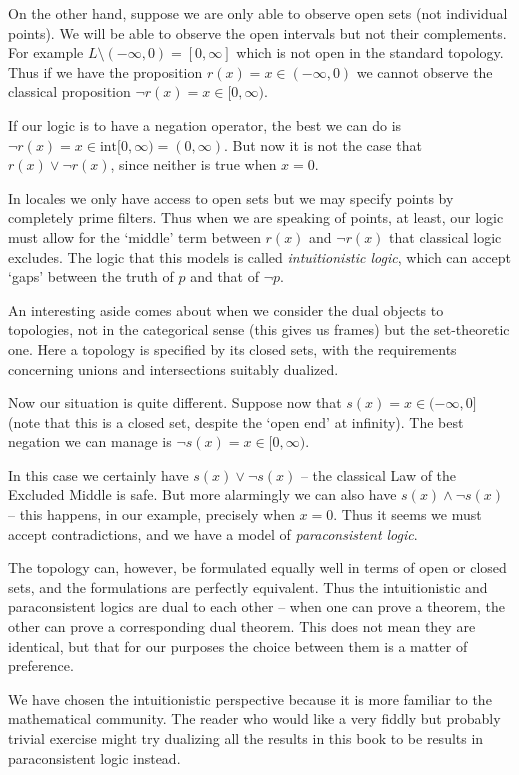 \documentclass[oneside,english]{amsbook}
\numberwithin{section}{chapter}
\theoremstyle{plain}
\theoremstyle{definition}
\begin{document}
On the other hand, suppose we are only able to observe open sets (not individual points). We will be able to observe the open intervals but not their complements. For example $L\setminus(-\infty, 0) = [0, \infty]$ which is not open in the standard topology. Thus if we have the proposition $r(x) = x\in (-\infty, 0)$ we cannot observe the classical proposition $\lnot r(x) = x\in [0, \infty)$. 

If our logic is to have a negation operator, the best we can do is $\lnot r(x) = x\in \text{int}[0, \infty) = (0, \infty)$. But now it is not the case that $r(x)\lor\lnot r(x)$, since neither is true when $x = 0$.

In locales we only have access to open sets but we may specify points by completely prime filters. Thus when we are speaking of points, at least, our logic must allow for the `middle' term between $r(x)$ and $\lnot r(x)$ that classical logic excludes. The logic that this models is called \emph{intuitionistic logic}, which can accept `gaps' between the truth of $p$ and that of $\lnot p$. 

An interesting aside comes about when we consider the dual objects to topologies, not in the categorical sense (this gives us frames) but the set-theoretic one. Here a topology is specified by its closed sets, with the requirements concerning unions and intersections suitably dualized.

Now our situation is quite different. Suppose now that $s(x) = x\in (-\infty, 0]$ (note that this is a closed set, despite the `open end' at infinity). The best negation we can manage is $\lnot s(x) = x\in [0, \infty)$.

In this case we certainly have $s(x)\lor \lnot s(x)$ -- the classical Law of the Excluded Middle is safe. But more alarmingly we can also have $s(x)\land \lnot s(x)$ -- this happens, in our example, precisely when $x = 0$. Thus it seems we must accept contradictions, and we have a model of \emph{paraconsistent logic}.

The topology can, however, be formulated equally well in terms of open or closed sets, and the formulations are perfectly equivalent. Thus the intuitionistic and paraconsistent logics are dual to each other -- when one can prove a theorem, the other can prove a corresponding dual theorem. This does not mean they are identical, but that for our purposes the choice between them is a matter of preference. 

We have chosen the intuitionistic perspective because it is more familiar to the mathematical community. The reader who would like a very fiddly but probably trivial exercise might try dualizing all the results in this book to be results in paraconsistent logic instead.
\end{document}
